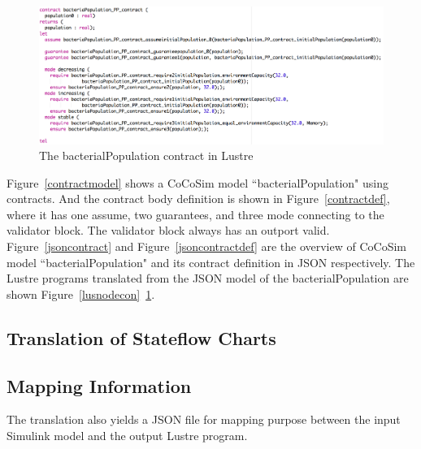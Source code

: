 \documentclass{article}
\begin{document}
\begin{figure}[h]
\begin{center}
  \includegraphics[scale=0.3]{figures/luscon}    
\end{center}  
  \caption{The bacterialPopulation contract in Lustre}
  \label{luscon}
\end{figure}

Figure~\ref{contractmodel} shows a CoCoSim model ``bacterialPopulation" using contracts. 
And the contract body definition is shown in Figure~\ref{contractdef}, where it has one \textsf{assume}, two \textsf{guarantees}, and three \textsf{mode} connecting to the \textsf{validator} block. 
The \textsf{validator} block always has an outport \textsf{valid}. 
Figure~\ref{jsoncontract} and Figure~\ref{jsoncontractdef} are the overview of CoCoSim model \textsf{``bacterialPopulation"} and its contract definition in JSON respectively. 
The Lustre programs translated from the JSON model of the bacterialPopulation are shown Figure~\ref{lusnodecon}~\ref{luscon}.

\subsection{Translation of Stateflow Charts}



\subsection{Mapping Information}

The translation also yields a JSON file for mapping purpose between the input Simulink model and the output Lustre program. 

\end{document}

